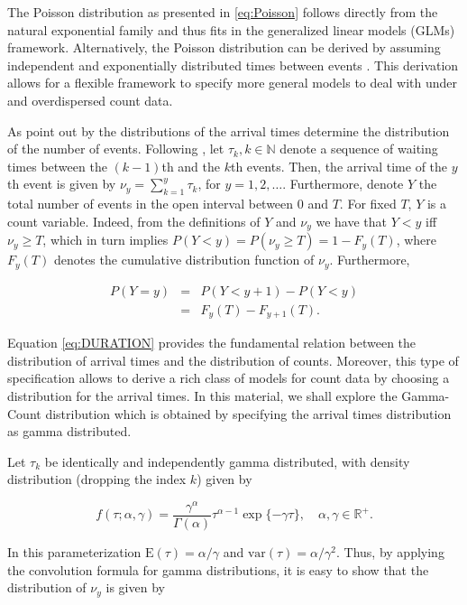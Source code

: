 \documentclass[9pt,a5paper,]{book}
\theoremstyle{definition}
\theoremstyle{definition}
\theoremstyle{remark}
\begin{document}
The Poisson distribution as presented in \eqref{eq:Poisson} follows
directly from the natural exponential family and thus fits in the
generalized linear models (GLMs) framework. Alternatively, the Poisson
distribution can be derived by assuming independent and exponentially
distributed times between events \citep{Zeviani2014}. This derivation
allows for a flexible framework to specify more general models to deal
with under and overdispersed count data.

As point out by \citet{Winkelmann2003} the distributions of the arrival
times determine the distribution of the number of events. Following
\citet{Winkelman1995}, let \({\tau_k, k \in \mathbb{N}}\) denote a
sequence of waiting times between the \((k-1)\)th and the \(k\)th
events. Then, the arrival time of the \(y\)th event is given by
\(\nu_y = \sum_{k = 1}^{y} \tau_k\), for \(y = 1, 2, \ldots\).
Furthermore, denote \(Y\) the total number of events in the open
interval between \(0\) and \(T\). For fixed \(T\), \(Y\) is a count
variable. Indeed, from the definitions of \(Y\) and \(\nu_y\) we have
that \(Y < y\) iff \(\nu_y \ge T\), which in turn implies
\(P(Y < y) = P(\nu_y \ge T) = 1 - F_y(T)\), where \(F_y(T)\) denotes the
cumulative distribution function of \(\nu_y\). Furthermore,

\begin{eqnarray}
P(Y = y) &=& P(Y < y+1) - P(Y < y) \\
     &=& F_y(T) - F_{y+1}(T).
\label{eq:DURATION}
\end{eqnarray}

Equation \eqref{eq:DURATION} provides the fundamental relation between the
distribution of arrival times and the distribution of counts. Moreover,
this type of specification allows to derive a rich class of models for
count data by choosing a distribution for the arrival times. In this
material, we shall explore the Gamma-Count distribution which is
obtained by specifying the arrival times distribution as gamma
distributed.

Let \(\tau_k\) be identically and independently gamma distributed, with
density distribution (dropping the index \(k\)) given by

\begin{equation}
f(\tau; \alpha, \gamma) = \frac{\gamma^{\alpha}}{\Gamma(\alpha)} \tau^{\alpha-1} \exp\{-\gamma \tau\}, \quad \alpha, \gamma \in \mathbb{R}^{+}.
\end{equation}

In this parameterization \(\mathrm{E}(\tau) = \alpha/\gamma\) and
\(\mathrm{var}(\tau) = \alpha/\gamma^2\). Thus, by applying the
convolution formula for gamma distributions, it is easy to show that the
distribution of \(\nu_y\) is given by
\end{document}
